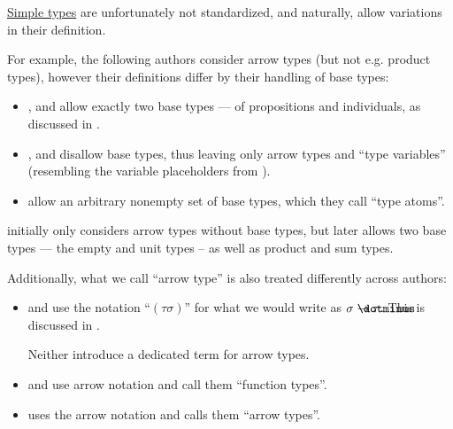 \begin{remark}\label{rem:simple_type_terminology_and_notation}
  \hyperref[def:simple_type]{Simple types} are unfortunately not standardized, and naturally, allow variations in their definition.

  For example, the following authors consider arrow types (but not e.g. product types), however their definitions differ by their handling of base types:
  \begin{itemize}
    \item {},  and  allow exactly two base types --- of propositions and individuals, as discussed in .

    \item {},  and  disallow base types, thus leaving only arrow types and \enquote{type variables} (resembling the variable placeholders from ).

    \item {} allow an arbitrary nonempty set of base types, which they call \enquote{type atoms}.
  \end{itemize}

   initially only considers arrow types without base types, but later allows two base types --- the empty and unit types -- as well as product and sum types.

  Additionally, what we call \enquote{arrow type} is also treated differently across authors:
  \begin{itemize}
    \item {} and  use the notation \enquote{\( (\tau\sigma) \)} for what we would write as \( \sigma \synimplies \tau \). This is discussed in .

    Neither introduce a dedicated term for arrow types.

    \item {} and  use arrow notation and call them \enquote{function types}.

    \item {} uses the arrow notation and calls them \enquote{arrow types}.


\end{itemize}
\end{remark}
